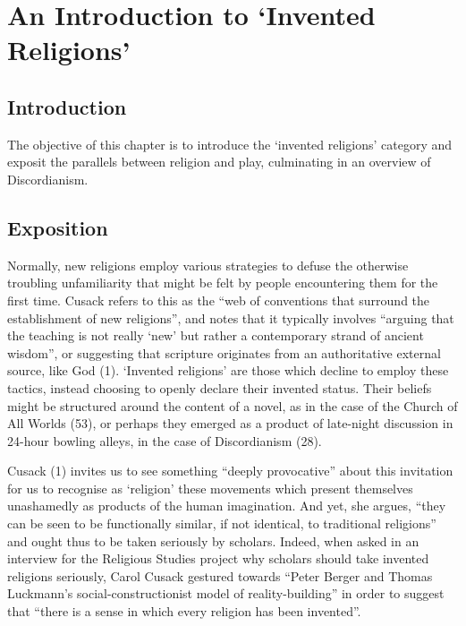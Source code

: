 \documentclass[Draft.tex]{subfiles}
\begin{document}
\chapter{An Introduction to `Invented Religions'}

\section*{Introduction}
The objective of this chapter is to introduce
the `invented religions' category
and exposit the parallels between religion and play,
culminating in an overview of Discordianism.

\section*{Exposition}
Normally, new religions employ various strategies
to defuse the otherwise troubling unfamiliarity
that might be felt by people encountering them for the first time.
Cusack refers to this as the
``web of conventions that surround the establishment of new religions'',
and notes that it typically involves
``arguing that the teaching is not really `new' but rather
a contemporary strand of ancient wisdom'',
or suggesting that scripture originates from
an authoritative external source, like God (1).
`Invented religions' are those which decline to employ these tactics,
instead choosing to openly declare their invented status.
Their beliefs might be structured around the content of a novel,
as in the case of the Church of All Worlds (53),
or perhaps they emerged as a product of late-night discussion in
24-hour bowling alleys, in the case of Discordianism (28).

Cusack (1) invites us to see something ``deeply provocative''
about this invitation for us to recognise as `religion'
these movements which present themselves unashamedly as
products of the human imagination.
And yet, she argues, ``they can be seen to be functionally similar,
if not identical, to traditional religions''
and ought thus to be taken seriously by scholars.
Indeed, when asked in an interview for the Religious Studies project
why scholars should take invented religions seriously,
Carol Cusack \parencite*{CusackPodcast} gestured towards
``Peter Berger and Thomas Luckmann’s
social-constructionist model of reality-building'' in order to suggest
that ``there is a sense in which every religion has been invented''.
\end{document}
